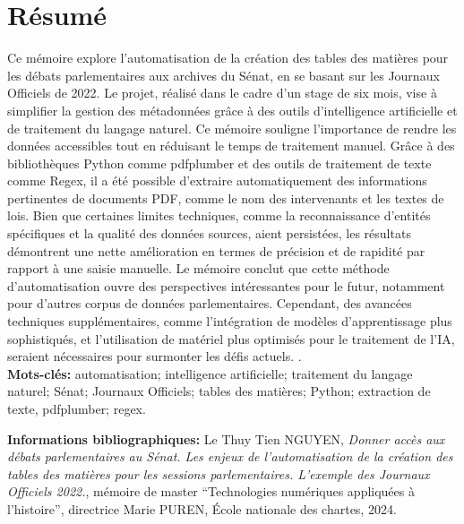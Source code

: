 \chapter*{Résumé}
\medskip
Ce mémoire explore l'automatisation de la création des tables des matières pour les débats parlementaires aux archives du Sénat, en se basant sur les Journaux Officiels de 2022. Le projet, réalisé dans le cadre d'un stage de six mois, vise à simplifier la gestion des métadonnées grâce à des outils d'intelligence artificielle et de traitement du langage naturel. Ce mémoire souligne l'importance de rendre les données accessibles tout en réduisant le temps de traitement manuel.
Grâce à des bibliothèques Python comme pdfplumber et des outils de traitement de texte comme Regex, il a été possible d'extraire automatiquement des informations pertinentes de documents PDF, comme le nom des intervenants et les textes de lois. Bien que certaines limites techniques, comme la reconnaissance d'entités spécifiques et la qualité des données sources, aient persistées, les résultats démontrent une nette amélioration en termes de précision et de rapidité par rapport à une saisie manuelle.
Le mémoire conclut que cette méthode d’automatisation ouvre des perspectives intéressantes pour le futur, notamment pour d'autres corpus de données parlementaires. Cependant, des avancées techniques supplémentaires, comme l'intégration de modèles d'apprentissage plus sophistiqués, et l'utilisation de matériel plus optimisés pour le traitement de l'IA, seraient nécessaires pour surmonter les défis actuels. .\\
	
\textbf{Mots-clés:} automatisation; intelligence artificielle; traitement du langage naturel; Sénat; Journaux Officiels; tables des matières; Python; extraction de texte, pdfplumber; regex.
	
\textbf{Informations bibliographiques:} Le Thuy Tien NGUYEN, \textit{Donner accès aux débats parlementaires au Sénat. Les enjeux de l’automatisation de la création des tables des matières pour les sessions parlementaires. L’exemple des Journaux Officiels 2022.}, mémoire de master \enquote{Technologies numériques appliquées à l'histoire}, directrice Marie PUREN, École nationale des chartes, 2024.